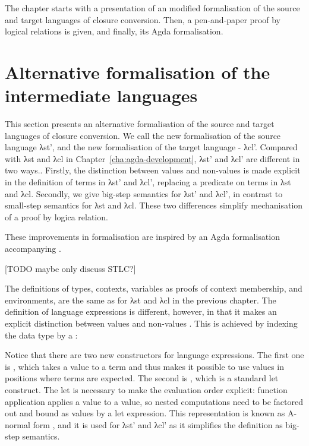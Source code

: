 \documentclass[bsc,frontabs,oneside,singlespacing,parskip,deptreport]{infthesis}
\theoremstyle{definition}
\begin{document}
The chapter starts with a presentation of an modified formalisation
of the source and target languages of closure conversion. Then, a
pen-and-paper proof by logical relations is given, and finally, its
Agda formalisation.

\section{Alternative formalisation of the intermediate languages}
\label{sec:altern-form-interm}

This section presents an alternative formalisation of the source and
target languages of closure conversion. We call the new formalisation
of the source language λst', and the new formalisation of the target
language - λcl'. Compared with λst and λcl in
Chapter~\ref{cha:agda-development}, λst' and λcl' are different in two
ways.. Firstly, the distinction between values and non-values is
made explicit in the definition of terms in λst' and λcl', replacing a predicate on
terms in λst and λcl. Secondly, we give big-step semantics for λst'
and λcl', in contrast to small-step semantics for λst and λcl. These
two differences simplify mechanisation of a proof by logica relation.

These improvements in formalisation are inspired by an Agda
formalisation accompanying \cite{DBLP:conf/cpp/McLaughlinMS18}.

[TODO maybe only discuss STLC?]

The definitions of types, contexts, variables as proofs of context
membership, and environments, are the same as for λst and λcl in the
previous chapter. The definition of language expressions is different,
however, in that it makes an explicit distinction between values  and
non-values . This is achieved by indexing the  data
type by a :



Notice that there are two new constructors for language
expressions. The first one is , which takes a value 
to a term  and thus makes it possible to use values in
positions where terms are expected. The second is , which is
a standard let construct. The let is necessary to make the evaluation
order explicit: function application applies a value to a value, so
nested computations need to be factored out and bound as values by a
let expression. This representation is known as A-normal form
\cite{DBLP:conf/lfp/SabryF92}, and it is used for λst' and λcl' as it
simplifies the definition as big-step semantics.
\end{document}
